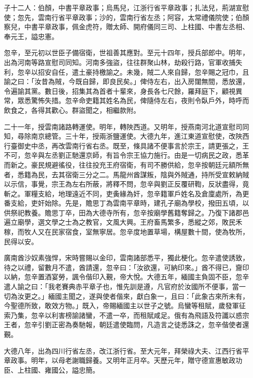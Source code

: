 \begin{pinyinscope}
 子十二人：伯顏，中書平章政事；烏馬兒，江浙行省平章政事；扎法兒，荊湖宣慰使；忽先，雲南行省平章政事；沙的，雲南行省左丞；阿容，太常禮儀院使；伯顏察兒，中書平章政事，佩金虎符，贈太師、開府儀同三司、上柱國、中書左丞相、奉元王，謚忠憲。



 忽辛，至元初以世臣子備宿衛，世祖善其應對。至元十四年，授兵部郎中。明年，出為河南等路宣慰司同知。河南多強盜，往往群聚山林，劫殺行路，官軍收捕失利，忽辛以招安自任，遣土豪持檄諭之。未幾，賊二人來自歸，忽辛賜之冠巾，且諭之曰：「汝昔為賊，今既自歸，即良民矣。」俾侍左右，出入房闥無間，悉放還，令遍諭其黨。數日後，招集其為首者十輩來，身長各七尺餘，羅拜庭下，顧視異常，眾悉驚怖失措。忽辛命吏籍其姓名為民，俾隨侍左右，夜則令臥戶外，時呼而飲食之，各得其歡心。群盜聞之，相繼款附。



 二十一年，授雲南諸路轉運使。明年，轉陜西道。又明年，授燕南河北道宣慰司同知，尋除南京總管。三十年，授兩浙鹽運使。大德九年，進江東道宣慰使，改陜西行臺御史中丞，再改雲南行省右丞。既至，條具諸不便事言於宗王，請更張之，王不可，忽辛與左丞劉正馳還京師，有旨令宗王協力施行。由是一切病民之政，悉革而新之。豪民規避徭役，往往投充王府宿衛，有司不勝供給，忽辛按朝廷元額所無者，悉籍為民，去其宿衛三分之二。馬龍州酋謀叛，陰與外賊通，持所受宣敕納賊以示信，事覺，宗王為左右所蔽，將釋不問，忽辛與劉正反覆研鞫，反狀盡得，竟斬之。軍糧支給，地理遠近不同，吏夤緣為奸，忽辛籍軍戶姓名及倉廩處所，為更番支給，吏奸始除。先是，贍思丁為雲南平章時，建孔子廟為學校，撥田五頃，以供祭祀教養。贍思丁卒，田為大德寺所有，忽辛按廟學舊籍奪歸之。乃復下諸郡邑遍立廟學，選文學之士為之教官，文風大興。王府畜馬繁多，悉縱之郊，敗民禾稼，而牧人又在民家宿食，室無寧居。忽辛度地置草場，構屋數十間，使為牧所，民得以安。



 廣南酋沙奴素強悍，宋時嘗賜以金印，雲南諸部悉平，獨此梗化。忽辛遣使誘致，待之以禮，留數月不遣，酋請還，忽辛曰：「汝欲還，可納印來。」酋不得已，齎印以納，忽辛置酒宴勞，諷令偕印入覲，帝大悅。大德五年，緬國主負固不臣，忽辛遣人諭之曰：「我老賽典赤平章子也，惟先訓是遵，凡官府於汝國所不便事，當一切為汝更之。」緬國主聞之，遂與使者偕來，獻白象一，且曰：「此象古來所未有，今聖德所致，敢效方物。」既入，帝賜緬國主以世子之號。烏蠻等租賦，歲發軍征索乃集，忽辛以利害榜諭諸蠻，不遣一卒，而租賦咸足。俄有為飛語及符讖以惑宗王者，忽辛引劉正密為奏馳報，朝廷遣使臨問，凡造言之徒悉誅之，忽辛偕使者還覲。



 大德八年，出為四川行省左丞，改江浙行省。至大元年，拜榮祿大夫、江西行省平章政事。明年，以母老謝職歸養。又明年正月卒。天歷元年，贈守德宣惠敏政功臣、上柱國、雍國公，謚忠簡。




\end{pinyinscope}
